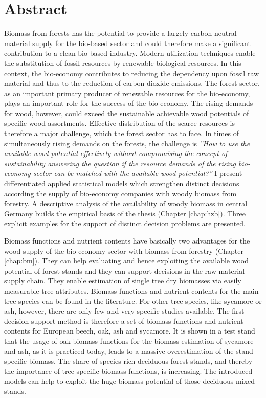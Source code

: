 \chapter*{Abstract}
\label{chap:Summary}
Biomass from forests has the potential to provide a largely carbon-neutral material supply for the bio-based sector and could therefore make a significant contribution to a clean bio-based industry. Modern utilization techniques enable the substitution of fossil resources by renewable biological resources. In this context, the bio-economy contributes to reducing the dependency upon fossil raw material and thus to the reduction of carbon dioxide emissions. The forest sector, as an important primary producer of renewable resources for the bio-economy, plays an important role for the success of the bio-economy. The rising demands for wood, however, could exceed the sustainable achievable wood potentials of specific wood assortments. Effective distribution of the scarce resources is therefore a major challenge, which the forest sector has to face. In times of simultaneously rising demands on the forests, the challenge is \textit{''How to use the available wood potential effectively without compromising the concept of sustainability answering the question if the resource demands of the rising bio-economy sector can be matched with the available wood potential?''} I present differentiated applied statistical models which strengthen distinct decisions according the supply of bio-economy companies with woody biomass from forestry. A descriptive analysis of the availability of woody biomass in central Germany builds the empirical basis of the thesis (Chapter \ref{chap:hzb}). Three explicit examples for the support of distinct decision problems are presented.

Biomass functions and nutrient contents have basically two advantages for the wood supply of the bio-economy sector with biomass from forestry (Chapter \ref{chap:bm}). They can help evaluating and hence exploiting the available wood potential of forest stands and they can support decisions in the raw material supply chain. They enable estimation of single tree dry biomasses via easily measurable tree attributes. Biomass functions and nutrient contents for the main tree species can be found in the literature. For other tree species, like sycamore or ash, however, there are only few and very specific studies available. The first decision support method is therefore a set of biomass functions and nutrient contents for European beech, oak, ash and sycamore. It is shown in a test stand that the usage of oak biomass functions for the biomass estimation of sycamore and ash, as it is practiced today, leads to a massive overestimation of the stand specific biomass. The share of species-rich deciduous forest stands, and thereby the importance of tree specific biomass functions, is increasing. The introduced models can help to exploit the huge biomass potential of those deciduous mixed stands.

